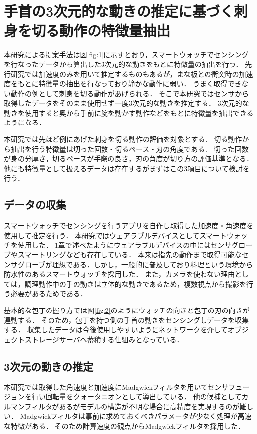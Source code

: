 \section{手首の3次元的な動きの推定に基づく刺身を切る動作の特徴量抽出}
本研究による提案手法は図\ref{fig:1}に示すとおり，スマートウォッチでセンシングを行なったデータから算出した3次元的な動きをもとに特徴量の抽出を行う．
先行研究\cite{kumazawaanalysis}では加速度のみを用いて推定するものもあるが，まな板との衝突時の加速度をもとに特徴量の抽出を行なっており静かな動作に弱い．
うまく取得できない動作の例として刺身を切る動作があげられる．
そこで本研究ではセンサから取得したデータをそのまま使用せず一度3次元的な動きを推定する．
3次元的な動きを使用すると奥から手前に腕を動かす動作などをもとに特徴量を抽出できるようになる．

本研究では先ほど例にあげた刺身を切る動作の評価を対象とする．
切る動作から抽出を行う特徴量は切った回数・切るペース・刃の角度である．
切った回数が身の分厚さ，切るペースが手際の良さ，刃の角度が切り方の評価基準となる．
他にも特徴量として扱えるデータは存在するがまずはこの3項目について検討を行う．



\subsection{データの収集}
スマートウォッチでセンシングを行うアプリを自作し取得した加速度・角速度を使用して推定を行う．
本研究ではウェアラブルデバイスとしてスマートウォッチを使用した．
1章で述べたようにウェアラブルデバイスの中にはセンサグローブやスマートリングなども存在している．
本来は指先の動作まで取得可能なセンサグローブが理想である．しかし，一般的に普及しており料理という環境から防水性のあるスマートウォッチを採用した．
また，カメラを使わない理由としては，調理動作中の手の動きは立体的な動きであるため，複数視点から撮影を行う必要があるためである．

基本的な包丁の握り方では図\ref{fig:2}のようにウォッチの向きと包丁の刃の向きが連動する．
そのため，包丁を持つ側の手首の動きをセンシングしデータを収集する．
収集したデータは今後使用しやすいようにネットワークを介してオブジェクトストレージサーバへ蓄積する仕組みとなっている．
\subsection{3次元の動きの推定}
本研究では取得した角速度と加速度にMadgwickフィルタを用いてセンサフュージョンを行い回転量をクォータニオンとして導出している．
他の候補としてカルマンフィルタがあるがモデルの構造が不明な場合に高精度を実現するのが難しい．
Madgwickフィルタは事前に求めておくべきパラメータが少なく処理が高速な特徴がある．
そのため計算速度の観点からMadgwickフィルタを採用した．

